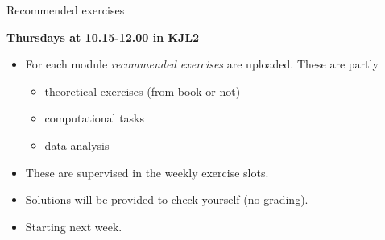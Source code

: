 \documentclass[
  10pt,
  ignorenonframetext,
]{beamer}
\providecommand{\tightlist}{%
  \setlength{\itemsep}{0pt}\setlength{\parskip}{0pt}}
\begin{document}
\begin{frame}
\begin{block}{Recommended exercises}
\protect\hypertarget{recommended-exercises}{}
\vspace{4mm}

\textbf{Thursdays at 10.15-12.00 in KJL2}

\vspace{4mm}

\begin{itemize}
\tightlist
\item
  For each module \emph{recommended exercises} are uploaded. These are
  partly

  \begin{itemize}
  \tightlist
  \item
    theoretical exercises (from book or not)
  \item
    computational tasks
  \item
    data analysis
  \end{itemize}
\end{itemize}

\vspace{2mm}

\begin{itemize}
\tightlist
\item
  These are supervised in the weekly exercise slots.
\end{itemize}

\vspace{2mm}

\begin{itemize}
\tightlist
\item
  Solutions will be provided to check yourself (no grading).
\end{itemize}

\vspace{2mm}

\begin{itemize}
\tightlist
\item
  Starting next week.
\end{itemize}

\(~\)
\end{block}
\end{frame}
\end{document}
